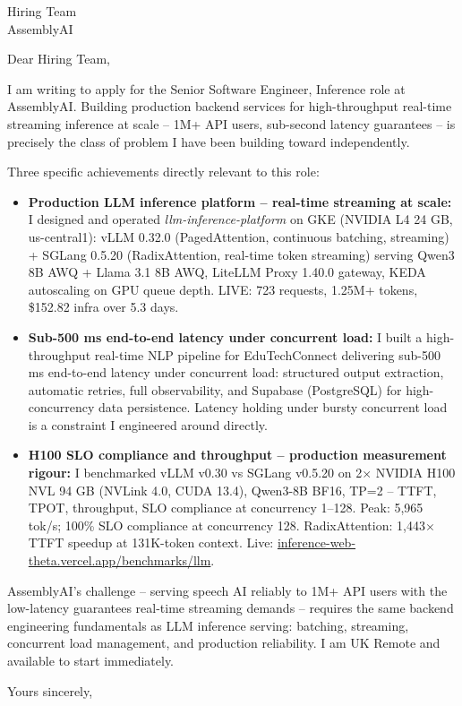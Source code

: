 \documentclass[a4paper]{letter}
\date{\today}
\begin{document}
\begin{letter}{Hiring Team \\ AssemblyAI}

\opening{Dear Hiring Team,}

I am writing to apply for the Senior Software Engineer, Inference role at AssemblyAI. Building production backend services for high-throughput real-time streaming inference at scale -- 1M+ API users, sub-second latency guarantees -- is precisely the class of problem I have been building toward independently.

Three specific achievements directly relevant to this role:

\begin{itemize}
  \item \textbf{Production LLM inference platform -- real-time streaming at scale:} I designed and operated \textit{llm-inference-platform} on GKE (NVIDIA L4 24 GB, us-central1): vLLM 0.32.0 (PagedAttention, continuous batching, streaming) + SGLang 0.5.20 (RadixAttention, real-time token streaming) serving Qwen3 8B AWQ + Llama 3.1 8B AWQ, LiteLLM Proxy 1.40.0 gateway, KEDA autoscaling on GPU queue depth. LIVE: 723 requests, 1.25M+ tokens, \$152.82 infra over 5.3 days.

  \item \textbf{Sub-500 ms end-to-end latency under concurrent load:} I built a high-throughput real-time NLP pipeline for EduTechConnect delivering sub-500 ms end-to-end latency under concurrent load: structured output extraction, automatic retries, full observability, and Supabase (PostgreSQL) for high-concurrency data persistence. Latency holding under bursty concurrent load is a constraint I engineered around directly.

  \item \textbf{H100 SLO compliance and throughput -- production measurement rigour:} I benchmarked vLLM v0.30 vs SGLang v0.5.20 on 2$\times$ NVIDIA H100 NVL 94 GB (NVLink 4.0, CUDA 13.4), Qwen3-8B BF16, TP=2 -- TTFT, TPOT, throughput, SLO compliance at concurrency 1--128. Peak: 5,965 tok/s; 100\% SLO compliance at concurrency 128. RadixAttention: 1,443$\times$ TTFT speedup at 131K-token context. Live: \href{https://inference-web-theta.vercel.app/benchmarks/llm}{inference-web-theta.vercel.app/benchmarks/llm}.
\end{itemize}

AssemblyAI's challenge -- serving speech AI reliably to 1M+ API users with the low-latency guarantees real-time streaming demands -- requires the same backend engineering fundamentals as LLM inference serving: batching, streaming, concurrent load management, and production reliability. I am UK Remote and available to start immediately.

\closing{Yours sincerely,}

\end{letter}
\end{document}
